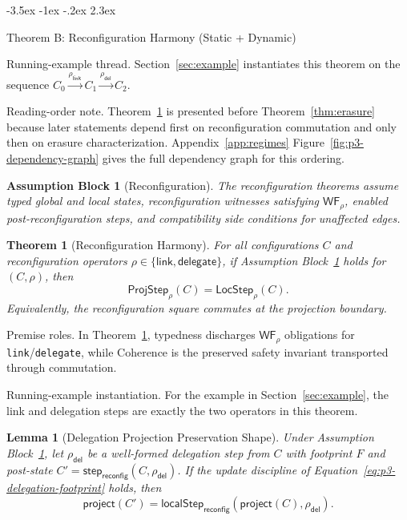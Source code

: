 \documentclass[a4paper,10pt,twocolumn,english]{article}
\makeatletter
\renewcommand{\section}{\@startsection{section}{1}{\z@}%
  {-3.5ex \@plus -1ex \@minus -.2ex}%
  {2.3ex}%
  {\raggedright\normalfont\large\bfseries}}
\numberwithin{equation}{section}
\theoremstyle{paperdef}
\theoremstyle{paperplain}
\newtheorem{theorem}[definition]{Theorem}
\newtheorem{lemma}[definition]{Lemma}
\theoremstyle{paperdef}
\theoremstyle{paperremark}
\theoremstyle{paperdef}
\newtheorem{assumptions}[assumption]{Assumption Block}
\newcommand{\ProjStep}[2]{\ensuremath{\mathsf{ProjStep}_{#2}(#1)}}
\newcommand{\LocStep}[2]{\ensuremath{\mathsf{LocStep}_{#2}(#1)}}
\makeatother
\begin{document}
\section{Theorem B: Reconfiguration Harmony (Static + Dynamic)}
\label{sec:theorem-b}

Running-example thread. Section~\ref{sec:example} instantiates this theorem on
the sequence $C_0 \xrightarrow{\rho_{\mathsf{link}}} C_1
	\xrightarrow{\rho_{\mathsf{del}}} C_2$.

Reading-order note. Theorem~\ref{thm:harmony} is presented before
Theorem~\ref{thm:erasure} because later statements depend first on
reconfiguration commutation and only then on erasure characterization.
Appendix~\ref{app:regimes} Figure~\ref{fig:p3-dependency-graph}
gives the full dependency graph for this ordering.

\begin{assumptions}[Reconfiguration]
	\label{assump:p3-reconfiguration}
	The reconfiguration theorems assume typed global and local states, reconfiguration
	witnesses satisfying $\mathsf{WF}_\rho$, enabled post-reconfiguration steps, and
	compatibility side conditions for unaffected edges.
\end{assumptions}

\begin{theorem}[Reconfiguration Harmony]
	\label{thm:harmony}
	For all configurations $C$ and reconfiguration operators $\rho \in \{\mathsf{link},
		\mathsf{delegate}\}$, if Assumption Block~\ref{assump:p3-reconfiguration} holds for $(C,\rho)$, then
	\begin{equation}
		\ProjStep{C}{\rho}
		=
		\LocStep{C}{\rho}.
	\end{equation}
	Equivalently, the reconfiguration square commutes at the projection boundary.
\end{theorem}

Premise roles. In Theorem~\ref{thm:harmony}, typedness discharges
$\mathsf{WF}_{\rho}$ obligations for \texttt{link}/\texttt{delegate}, while
Coherence is the preserved safety invariant transported through commutation.

Running-example instantiation. For the example in
Section~\ref{sec:example}, the link and delegation steps are exactly the two
operators in this theorem.

\begin{lemma}[Delegation Projection Preservation Shape]
	\label{lem:p3-deleg-proj-shape}
	Under Assumption Block~\ref{assump:p3-reconfiguration}, let $\rho_{\mathsf{del}}$ be a well-formed delegation step from $C$ with footprint $F$ and post-state $C'=\mathsf{step}_{\mathsf{reconfig}}(C,\rho_{\mathsf{del}})$. If the update discipline of Equation~\ref{eq:p3-delegation-footprint} holds, then
	\begin{equation}
		\mathsf{project}(C')
		=
		\mathsf{localStep}_{\mathsf{reconfig}}(\mathsf{project}(C),\rho_{\mathsf{del}}).
	\end{equation}
\end{lemma}
\end{document}
